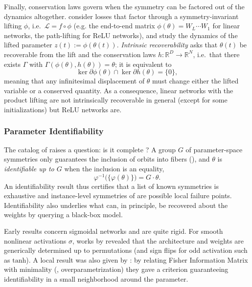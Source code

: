 \documentclass[mathematics,review,submit,moreauthors]{Definitions/mdpi}
\begin{document}
Finally, conservation laws govern when the symmetry can be factored out of the dynamics altogether.
\citet{marcotte2026} consider losses that factor through a symmetry-invariant lifting $\phi$, i.e.\ $\mathcal{L}=f\circ\phi$ (e.g. the end-to-end matrix $\phi(\theta)=W_L\cdots W_1$ for linear networks, the path-lifting for ReLU networks), and study the dynamics of the lifted parameter $z(t):=\phi(\theta(t))$.
\emph{Intrinsic recoverability} asks that $\theta(t)$ be recoverable from the lift and the conservation laws $h:\mathbb{R}^D\to\mathbb{R}^N$, i.e.\ that there exists $\Gamma$ with $\Gamma(\phi(\theta),h(\theta))=\theta$; it is equivalent to
\begin{equation*}
    \ker\partial\phi(\theta)\cap\ker\partial h(\theta)=\{0\},
\end{equation*}
meaning that any infinitesimal displacement of $\theta$ must change either the lifted variable or a conserved quantity.
As a consequence, linear networks with the product lifting are not intrinsically recoverable in general (except for some initializations) but ReLU networks are.

\subsubsection{Parameter Identifiability}\label{sec:parameter-identifiability}
The catalog of  raises a question: is it complete ?
A group $G$ of parameter-space symmetries only guarantees the inclusion of orbits into fibers (), and $\theta$ is \emph{identifiable up to $G$} when the inclusion is an equality,
\begin{equation*}
    \varphi^{-1}\big(\{\varphi(\theta)\}\big)=G\cdot\theta.
\end{equation*}
An identifiability result thus certifies that a list of known symmetries is exhaustive and instance-level symmetries of  are possible local failure points.
Identifiability also underlies what can, in principle, be recovered about the weights by querying a black-box model.

Early results concern sigmoidal networks and are quite rigid.
For smooth nonlinear activations $\sigma$, works by \citet{albertini1993,fefferman1993anips} revealed that the architecture and weights are generically determined up to permutations (and sign flips for odd activation such as $\mathrm{tanh}$).
A local result was also given by \citet{fukumizu1996nn}: by relating Fisher Information Matrix with minimality (, overparametrization) they gave a criterion guaranteeing identifiability in a small neighborhood around the parameter.
\end{document}

